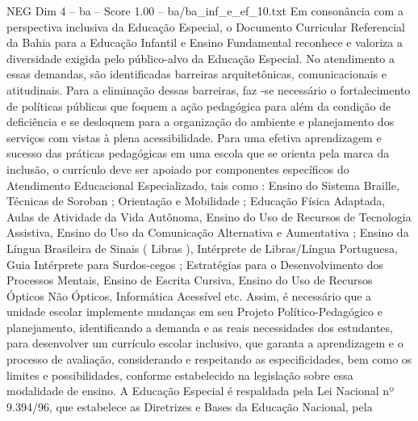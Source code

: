 \begin{textsample}{NEG Dim 4 – ba – Score 1.00 – ba/ba\_inf\_e\_ef\_10.txt}
Em consonância com a perspectiva inclusiva da Educação Especial, o Documento Curricular Referencial da Bahia para a Educação Infantil e Ensino Fundamental reconhece e valoriza a diversidade exigida pelo público-alvo da Educação Especial.
No atendimento a essas demandas, são identificadas barreiras arquitetônicas, comunicacionais e atitudinais.
Para a eliminação dessas barreiras, faz -se necessário o fortalecimento de políticas públicas que foquem a ação pedagógica para além da condição de deficiência e se desloquem para a organização do ambiente e planejamento dos serviços com vistas à plena acessibilidade.
Para uma efetiva aprendizagem e sucesso das práticas pedagógicas em uma escola que se orienta pela marca da inclusão, o currículo deve ser apoiado por componentes específicos do Atendimento Educacional Especializado, tais como : Ensino do Sistema Braille, Técnicas de Soroban ; Orientação e Mobilidade ; Educação Física Adaptada, Aulas de Atividade da Vida Autônoma, Ensino do Uso de Recursos de Tecnologia Assistiva, Ensino do Uso da Comunicação Alternativa e Aumentativa ; Ensino da Língua Brasileira de Sinais ( Libras ), Intérprete de Libras/Língua Portuguesa, Guia Intérprete para Surdos-cegos ; Estratégias para o Desenvolvimento dos Processos Mentais, Ensino de Escrita Cursiva, Ensino do Uso de Recursos Ópticos Não Ópticos, Informática Acessível etc.
Assim, é necessário que a unidade escolar implemente mudanças em seu Projeto Político-Pedagógico e planejamento, identificando a demanda e as reais necessidades dos estudantes, para desenvolver um currículo escolar inclusivo, que garanta a aprendizagem e o processo de avaliação, considerando e respeitando as especificidades, bem como os limites e possibilidades, conforme estabelecido na legislação sobre essa modalidade de ensino.
A Educação Especial é respaldada pela Lei Nacional nº 9.394/96, que estabelece as Diretrizes e Bases da Educação Nacional, pela

\end{textsample}
